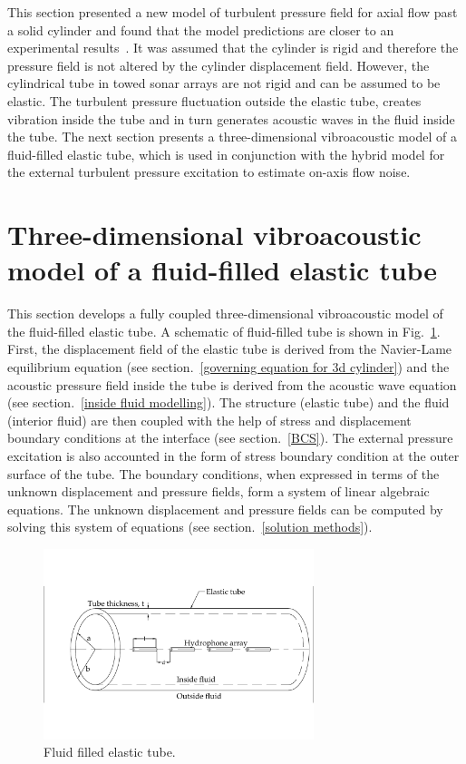 \documentclass[twocolumn,10pt]{asme2ej}
\begin{document}
This section presented a new model of turbulent pressure field for axial flow past a solid cylinder and found that the model predictions are closer to an experimental results~\cite{Unni2011}. It was assumed that the cylinder is rigid and therefore the pressure field is not altered by the cylinder displacement field. However, the cylindrical tube in towed sonar arrays are not rigid and can be assumed to be elastic. The turbulent pressure fluctuation outside the elastic tube, creates vibration inside the tube and in turn generates acoustic waves in the fluid inside the tube. The next section presents a three-dimensional vibroacoustic model of a fluid-filled elastic tube, which is used in conjunction with the hybrid model for the external turbulent pressure excitation to estimate on-axis flow noise.


\section{Three-dimensional vibroacoustic model of a fluid-filled elastic tube} \label{sec:vamodel}
This section develops a fully coupled three-dimensional vibroacoustic model of the fluid-filled elastic tube. A schematic of fluid-filled tube is shown in Fig.~\ref{fig:fluid filled elastic tube}. First, the displacement field of the elastic tube is derived from the Navier-Lame equilibrium equation (see section.~\ref{governing equation for 3d cylinder}) and the acoustic pressure field inside the tube is derived from the acoustic wave equation (see section.~\ref{inside fluid modelling}). The structure (elastic tube) and the fluid (interior fluid) are then coupled with the help of stress and displacement boundary conditions at the interface (see section.~\ref{BCS}). The external pressure excitation is also accounted in the form of stress boundary condition at the outer surface of the tube. The boundary conditions, when expressed in terms of the unknown displacement and pressure fields, form a system of linear algebraic equations. The unknown displacement and pressure fields can be computed by solving this system of equations (see section.~\ref{solution methods}).

\begin{figure}
    \centering
    \includegraphics[width=3.1in]{figure/Sonar_array_element.pdf}
    \caption{Fluid filled elastic tube.}
    \label{fig:fluid filled elastic tube}
\end{figure}
\end{document}
